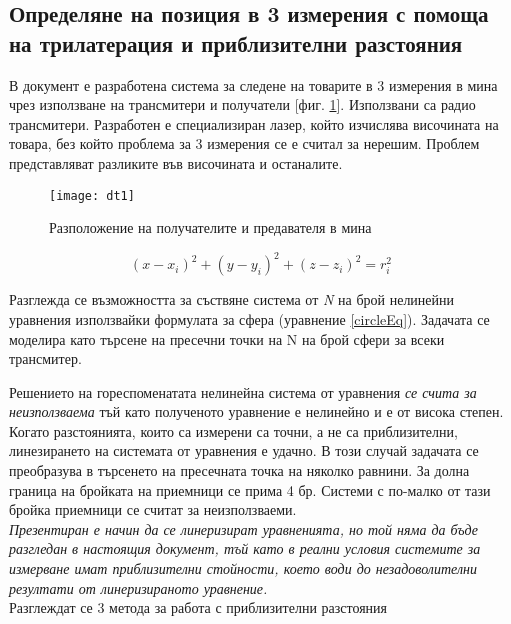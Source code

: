 \subsection{Определяне на позиция в 3 измерения с помоща на трилатерация и приблизителни разстояния}

В документ \cite{murphy} е разработена система за следене на товарите в 3 измерения в мина чрез използване на трансмитери и получатели [фиг. \ref{fig:mine}]. Използвани са радио трансмитери. Разработен е специализиран лазер, който изчислява височината на товара, без който проблема за 3 измерения се е считал за нерешим. Проблем представляват разликите във височината и останалите.

\begin{figure}
    \centering
    \centerline{\texttt{[image: dt1]}}
    \caption{Разположение на получателите и предавателя в мина}
    \label{fig:mine}
\end{figure}

\begin{equation}\label{circleEq}
    (x-x_i)^2 + (y-y_i)^2 +(z-z_i)^2=r_i^2
\end{equation}

Разглежда се възможността за съствяне система от \textit{N} на брой нелинейни уравнения използвайки формулата за сфера (уравнение \ref{circleEq}). Задачата се моделира като търсене на пресечни точки на N на брой сфери за всеки трансмитер.

Решението на гореспоменатата нелинейна система от уравнения \emph{се счита за неизползваема} тъй като полученото уравнение е нелинейно и е от висока степен. Когато разстоянията, които са измерени са точни, а не са приблизителни, линезирането на системата от уравнения е удачно. В този случай задачата се преобразува в търсенето на пресечната точка на няколко равнини.  За долна граница на бройката на приемници се прима 4 бр. Системи с по-малко от тази бройка приемници се считат за неизползваеми. \\

\emph{
    Презентиран е начин да се линеризират уравненията, но той няма да бъде разгледан в настоящия документ, тъй като в реални условия системите за измерване имат приблизителни стойности, което води до незадоволителни резултати от линеризираното уравнение.
}
\\

Разглеждат се 3 метода за работа с приблизителни разстояния

